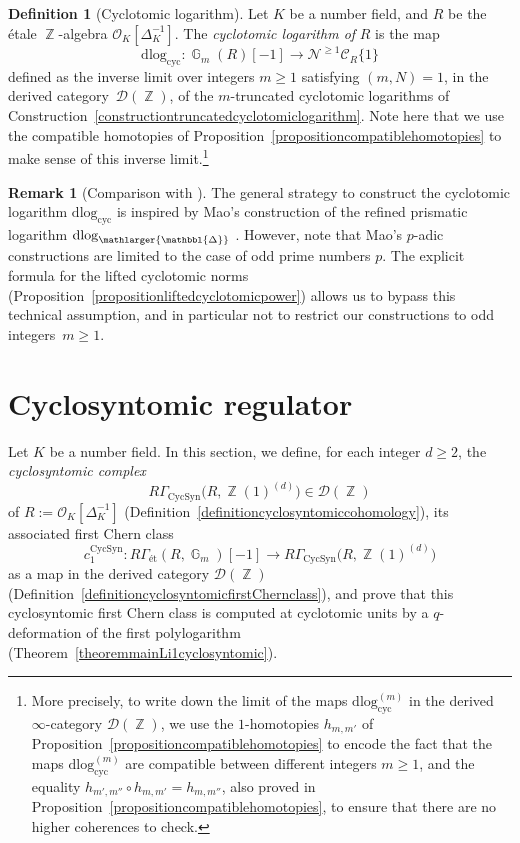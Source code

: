 \documentclass[10pt,twoside]{scrarticle}
\newlength{\mar} \setlength{\mar}{1cm}%
\newlength{\len}
\theoremstyle{definition}
\newtheorem{remark}[theorem]{Remark}
\newtheorem{definition}[theorem]{Definition}
\DeclareMathOperator{\Z}{\mathbb{Z}}
\DeclareMathOperator{\G}{\mathbb{G}}
\newcommand{\nbrrg}{\mathcal{O}_K[\Delta_K^{-1}]}
\newcommand{\CR}{\mathcal{C}_{R}}
\newcommand{\Cyc}{\mathrm{cyc}}
\newcommand{\CycSyn}{\mathrm{CycSyn}}
\renewcommand{\ge}{\geqslant}
\newcommand{\dlog}{\mathrm{dlog}}
\newcommand{\Prism}{{\mathlarger{\mathbbl{\Delta}}}}
\numberwithin{equation}{theorem}
\begin{document}
\begin{definition}[Cyclotomic logarithm]\label{definitioncyclotomiclogarithm}
    Let $K$ be a number field, and $R$ be the étale $\Z$-algebra $\nbrrg$. 
    The \emph{cyclotomic logarithm of} $R$ is the map
    $$\dlog_{\Cyc} : \G_m(R)[-1] \longrightarrow \mathcal{N}^{\ge 1} \CR\{1\}$$
    defined as the inverse limit over integers $m \ge 1$ satisfying $(m,N)=1$, in the derived category~$\mathcal{D}(\Z)$, of the $m$-truncated cyclotomic logarithms of Construction~\ref{constructiontruncatedcyclotomiclogarithm}. Note here that we use the compatible homotopies of Proposition~\ref{propositioncompatiblehomotopies} to make sense of this inverse limit.\footnote{More precisely, to write down the limit of the maps $\dlog_{\Cyc}^{(m)}$ in the derived $\infty$-category $\mathcal{D}(\Z)$, we use the $1$\nobreakdash-homotopies $h_{m,m'}$ of Proposition~\ref{propositioncompatiblehomotopies} to encode the fact that the maps $\dlog_{\Cyc}^{(m)}$ are compatible between different integers $m \ge 1$, and the equality $h_{m',m''} \circ h_{m,m'} = h_{m,m''}$, also proved in Proposition~\ref{propositioncompatiblehomotopies}, to ensure that there are no higher coherences to check.}
\end{definition}

\begin{remark}[Comparison with \cite{mao_prismatic_2024}]\label{remarkcomparisontoMao}
    The general strategy to construct the cyclotomic logarithm $\dlog_{\Cyc}$ is inspired by Mao's construction of the refined prismatic logarithm $\dlog_{\Prism}$ \cite[Section~2]{mao_prismatic_2024}. However, note that Mao's $p$-adic constructions are limited to the case of odd prime numbers $p$. The explicit formula for the lifted cyclotomic norms (Proposition~\ref{propositionliftedcyclotomicpower}) allows us to bypass this technical assumption, and in particular not to restrict our constructions to odd integers~$m \ge 1$. 
\end{remark}







\section{Cyclosyntomic regulator}\label{sec:first-polylog}

Let $K$ be a number field. In this section, we define, for each integer $d \ge 2$, the \textit{cyclosyntomic complex}
$$R\Gamma_{\CycSyn}\big(R,\Z(1)^{(d)}\big) \in \mathcal{D}(\Z)$$
of $R:=\nbrrg$ (Definition~\ref{definitioncyclosyntomiccohomology}), its associated first Chern class
$$c_1^{\CycSyn} : R\Gamma_{\text{ét}}(R,\G_m)[-1] \longrightarrow R\Gamma_{\CycSyn}\big(R,\Z(1)^{(d)}\big)$$
as a map in the derived category $\mathcal{D}(\Z)$ (Definition~\ref{definitioncyclosyntomicfirstChernclass}), and prove that this cyclosyntomic first Chern class is computed at cyclotomic units by a $q$-deformation of the first polylogarithm (Theorem~\ref{theoremmainLi1cyclosyntomic}).
\end{document}
